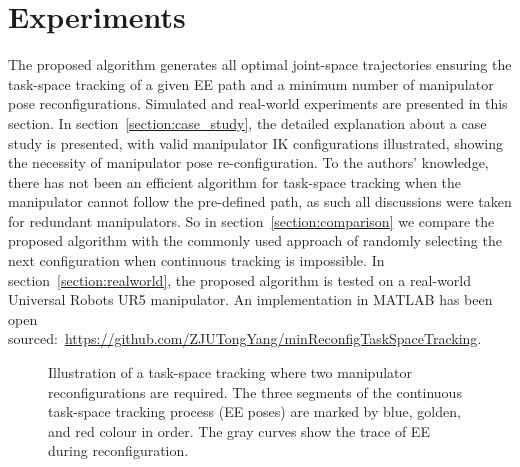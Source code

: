 \documentclass[letterpaper, 10 pt, journal, twoside]{ieeetran}  %
\begin{document}
\section{Experiments}\label{section:experiments}
The proposed algorithm generates all optimal joint-space trajectories ensuring the task-space tracking of a given EE path and a minimum number of manipulator pose reconfigurations. Simulated and real-world experiments are presented in this section. 
In section~\ref{section:case_study}, the detailed explanation about a case study is presented, with valid manipulator IK configurations illustrated, showing the necessity of manipulator pose re-configuration. 
To the authors' knowledge, there has not been an efficient algorithm for task-space tracking when the manipulator cannot follow the pre-defined path, as such all discussions were taken for redundant manipulators. So in section~\ref{section:comparison} we compare the proposed algorithm with the commonly used approach of randomly selecting the next configuration when continuous tracking is impossible.
In section~\ref{section:realworld}, the proposed algorithm is tested on a real-world Universal Robots UR5 manipulator. 
An implementation in MATLAB has been open sourced:~\url{https://github.com/ZJUTongYang/minReconfigTaskSpaceTracking}. 



\begin{figure}[t]
\centering
{}
\caption{Illustration of a task-space tracking where two manipulator reconfigurations are required. The three segments of the continuous task-space tracking process (EE poses) are marked by blue, golden, and red colour in order. The gray curves show the trace of EE during reconfiguration.}\label{fig:case_study}
\vspace{-0.5cm}
\end{figure}
\end{document}
